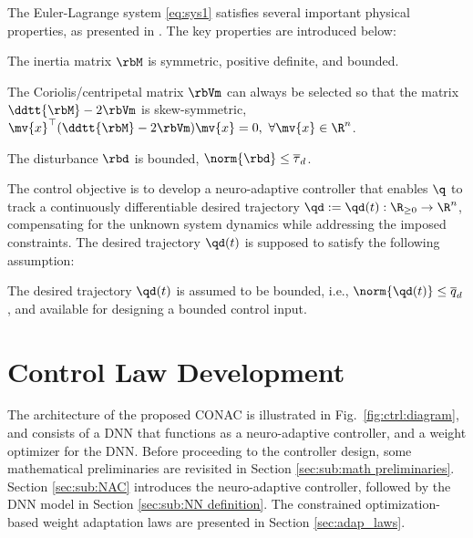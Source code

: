 \documentclass[lettersize,journal]{IEEEtran}
\begin{document}
The Euler-Lagrange system \eqref{eq:sys1} satisfies several important physical properties, as presented in \cite[Chap. 3 Tab. 3.2.1]{Lewis:1998aa}. 
The key properties are introduced below:
\begin{prop} 
    The inertia matrix $\rbM$ is symmetric, positive definite, and bounded.
    \label{prop:M}
\end{prop}

\begin{prop} 
    The Coriolis/centripetal matrix $\rbVm$ can always be selected so that the matrix $\ddtt{\rbM}-2\rbVm$ is skew-symmetric, \ie $\mv{x}^\top(\ddtt{\rbM}-2\rbVm)\mv{x}=0,\ \forall \mv{x}\in\R^n$.
    \label{prop:skew}
\end{prop}

\begin{prop}
    The disturbance $\rbd$ is bounded, \ie $\norm{\rbd}\le \overline\tau_d$.
    \label{prop:dis_bound}
\end{prop}

The control objective is to develop a neuro-adaptive controller that enables $\q$ to track a continuously differentiable desired trajectory $\qd:=\qd(t): \R_{\ge0} \to \R^n$, compensating for the unknown system dynamics while addressing the imposed constraints.
The desired trajectory $\qd(t)$ is supposed to satisfy the following assumption:
\begin{assum}
    The desired trajectory $\qd(t)$ is assumed to be bounded, i.e., $\norm{\qd(t)}\le \overline{q}_d$ , and available for designing a bounded control input.
    \label{assum:feasible}
\end{assum}

\section{Control Law Development}\label{sec:ctrl design}

The architecture of the proposed CONAC is illustrated in Fig.~\ref{fig:ctrl:diagram}, and consists of a DNN that functions as a neuro-adaptive controller, and a weight optimizer for the DNN.
Before proceeding to the controller design, some mathematical preliminaries are revisited in Section \ref{sec:sub:math preliminaries}. 
Section \ref{sec:sub:NAC} introduces the neuro-adaptive controller, followed by the DNN model in Section \ref{sec:sub:NN definition}. 
The constrained optimization-based weight adaptation laws are presented in Section \ref{sec:adap_laws}.
\end{document}
